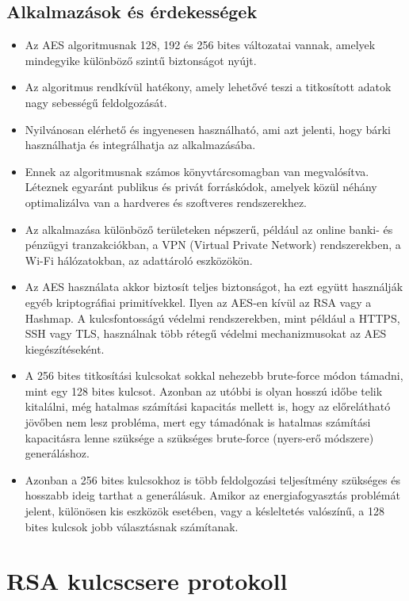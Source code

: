 \pagebreak
\subsection{Alkalmazások és érdekességek}

\begin{itemize}
	\item Az AES algoritmusnak 128, 192 és 256 bites változatai vannak, amelyek mindegyike különböző szintű biztonságot nyújt.
	\item Az algoritmus rendkívül hatékony, amely lehetővé teszi a titkosított adatok nagy sebességű feldolgozását.
	\item Nyilvánosan elérhető és ingyenesen használható, ami azt jelenti, hogy bárki használhatja és integrálhatja az alkalmazásába.
	\item Ennek az algoritmusnak számos könyvtárcsomagban van megvalósítva. Léteznek egyaránt publikus és privát forráskódok, amelyek közül néhány optimalizálva van a hardveres és szoftveres rendszerekhez.
	\item Az alkalmazása különböző területeken népszerű, például az online banki- és pénzügyi tranzakciókban, a VPN (Virtual Private Network) rendszerekben, a Wi-Fi hálózatokban, az adattároló eszközökön.
	\item Az AES használata akkor biztosít teljes biztonságot, ha ezt együtt használják egyéb kriptográfiai primitívekkel. Ilyen az AES-en kívül az RSA vagy a Hashmap. A kulcsfontosságú védelmi rendszerekben, mint például a HTTPS, SSH vagy TLS, használnak több rétegű védelmi mechanizmusokat az AES kiegészítéseként.
	\item A 256 bites titkosítási kulcsokat sokkal nehezebb brute-force módon támadni, mint egy 128 bites kulcsot. Azonban az utóbbi is olyan hosszú időbe telik kitalálni, még hatalmas számítási kapacitás mellett is, hogy az előrelátható jövőben nem lesz probléma, mert egy támadónak is hatalmas számítási kapacitásra lenne szüksége a szükséges brute-force (nyers-erő módszere) generáláshoz.
	\item Azonban a 256 bites kulcsokhoz is több feldolgozási teljesítmény szükséges és hosszabb ideig tarthat a generálásuk. Amikor az energiafogyasztás problémát jelent, különösen kis eszközök esetében, vagy a késleltetés valószínű, a 128 bites kulcsok jobb választásnak számítanak.
\end{itemize}

\section {RSA kulcscsere protokoll}

